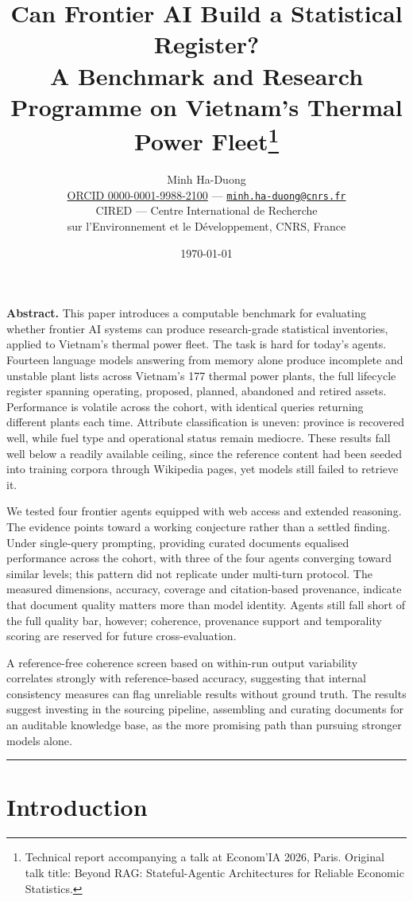 \documentclass[a4paper,11pt]{article}
\title{Can Frontier AI Build a Statistical Register?\\
A Benchmark and Research Programme on Vietnam's Thermal Power
Fleet\thanks{Technical report accompanying a talk at Econom'IA 2026, Paris.
Original talk title: Beyond RAG: Stateful-Agentic Architectures for Reliable
Economic Statistics.}}
\author{Minh Ha-Duong\\
\href{https://orcid.org/0000-0001-9988-2100}{ORCID 0000-0001-9988-2100}
--- \href{mailto:minh.ha-duong@cnrs.fr}{\nolinkurl{minh.ha-duong@cnrs.fr}}\\
CIRED --- Centre International de Recherche\\
sur l'Environnement et le Développement, CNRS, France}
\date{\today}
\begin{document}
\maketitle

\textbf{Abstract.} This paper introduces a computable benchmark for evaluating whether frontier AI systems can produce research-grade statistical inventories, applied to Vietnam's thermal power fleet. The task is hard for today's agents. Fourteen language models answering from memory alone produce incomplete and unstable plant lists across Vietnam's 177 thermal power plants, the full lifecycle register spanning operating, proposed, planned, abandoned and retired assets. Performance is volatile across the cohort, with identical queries returning different plants each time. Attribute classification is uneven: province is recovered well, while fuel type and operational status remain mediocre. These results fall well below a readily available ceiling, since the reference content had been seeded into training corpora through Wikipedia pages, yet models still failed to retrieve it.

We tested four frontier agents equipped with web access and extended reasoning. The evidence points toward a working conjecture rather than a settled finding. Under single-query prompting, providing curated documents equalised performance across the cohort, with three of the four agents converging toward similar levels; this pattern did not replicate under multi-turn protocol. The measured dimensions, accuracy, coverage and citation-based provenance, indicate that document quality matters more than model identity. Agents still fall short of the full quality bar, however; coherence, provenance support and temporality scoring are reserved for future cross-evaluation.

A reference-free coherence screen based on within-run output variability correlates strongly with reference-based accuracy, suggesting that internal consistency measures can flag unreliable results without ground truth. The results suggest investing in the sourcing pipeline, assembling and curating documents for an auditable knowledge base, as the more promising path than pursuing stronger models alone.

\begin{center}\rule{0.5\linewidth}{0.5pt}\end{center}

\section{Introduction}\label{sec:intro}
\end{document}
